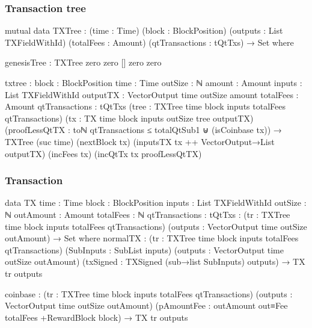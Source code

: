 \documentclass{beamer}
\begin{document}
\begin{frame}
  \frametitle{Transaction tree}
\begin{code}

      mutual
        data TXTree : (time : Time) (block : BlockPosition)
          (outputs : List TXFieldWithId)
          (totalFees : Amount)
          (qtTransactions : tQtTxs) → Set where

          genesisTree : TXTree zero zero [] zero zero

\end{code}
\end{frame}
\begin{frame}
\begin{code}

          txtree      :
            {block : BlockPosition} {time : Time}
            {outSize : ℕ} {amount : Amount}
            {inputs : List TXFieldWithId}
            {outputTX : VectorOutput time outSize amount}
            {totalFees : Amount} {qtTransactions : tQtTxs}
            (tree : TXTree time block inputs totalFees qtTransactions)
            (tx : TX {time} {block} {inputs} {outSize} tree outputTX)
            (proofLessQtTX :
                toℕ qtTransactions ≤ totalQtSub1
                ⊎
                (isCoinbase tx))
            → TXTree (suc time)
              (nextBlock tx)
              (inputsTX tx ++ VectorOutput→List outputTX)
              (incFees tx) (incQtTx tx proofLessQtTX)

\end{code}
\end{frame}
\begin{frame}
  \frametitle{Transaction}
\begin{code}

        data TX {time : Time} {block : BlockPosition}
            {inputs : List TXFieldWithId} {outSize : ℕ}
            {outAmount : Amount} {totalFees : ℕ}
            {qtTransactions : tQtTxs}
          : (tr : TXTree time block inputs totalFees qtTransactions)
            (outputs : VectorOutput time outSize outAmount)
            → Set where
          normalTX :
            (tr : TXTree time block inputs totalFees qtTransactions)
            (SubInputs : SubList inputs)
            (outputs : VectorOutput time outSize outAmount)
            (txSigned : TXSigned (sub→list SubInputs) outputs)
            → TX tr outputs

\end{code}
\end{frame}
\begin{frame}
\begin{code}

          coinbase :
            (tr : TXTree time block inputs totalFees qtTransactions)
            (outputs : VectorOutput time outSize outAmount)
            (pAmountFee : outAmount out≡Fee totalFees
              +RewardBlock block)
            → TX tr outputs

\end{code}
\end{frame}
\end{document}
